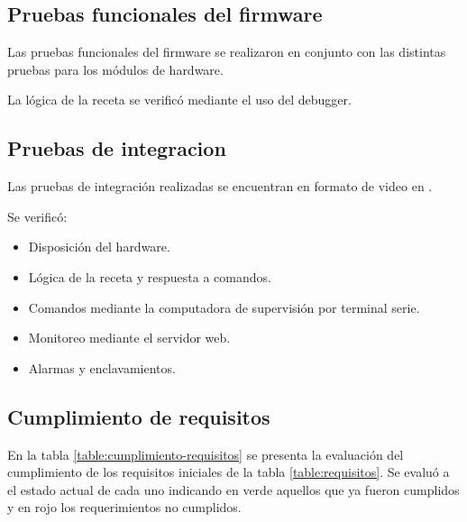 \subsection{Pruebas funcionales del firmware}
Las pruebas funcionales del firmware se realizaron en conjunto con las distintas pruebas para los módulos de hardware.

La lógica de la receta se verificó mediante el uso del debugger.

\subsection{Pruebas de integracion}
Las pruebas de integración realizadas se encuentran en formato de video en \cite{PDI}.

Se verificó:

\begin{itemize}
\item Disposición del hardware.
\item Lógica de la receta y respuesta a comandos.
\item Comandos mediante la computadora de supervisión por terminal serie.
\item Monitoreo mediante el servidor web.
\item Alarmas y enclavamientos.
\end{itemize}

\subsection{Cumplimiento de requisitos}
En la tabla \ref{table:cumplimiento-requisitos} se presenta la evaluación del cumplimiento de los requisitos iniciales de la tabla \ref{table:requisitos}. Se evaluó a el estado actual de cada uno indicando en verde aquellos que ya fueron cumplidos y en rojo los requerimientos no cumplidos.

